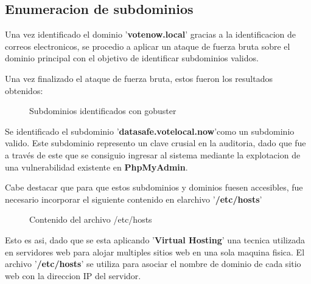 \documentclass[a4paper]{article} %
\begin{document}
  \clearpage
  
  \subsection{Enumeracion de subdominios}
  Una vez identificado el dominio '\textbf{votenow.local}' gracias a la identificacion de correos electronicos, se procedio a aplicar un ataque de fuerza bruta sobre el dominio principal con el objetivo de identificar subdominios validos.

  Una vez finalizado el ataque de fuerza bruta, estos fueron los resultados obtenidos:

  \begin{figure}[h]

    \centering
    \setlength{\fboxrule}{1.8pt}
      \caption{Subdominios identificados con gobuster}
      \label{fig:identifiedSubdomains}
  \end{figure}
    
  \vspace{0.3cm}  
      
  Se identificado el subdominio '\textbf{datasafe.votelocal.now}'como un subdominio valido. Este subdominio represento un clave crusial en la auditoria, dado que fue a través de este que se consiguio ingresar al sistema mediante la explotacion de una vulnerabilidad existente en \textbf{PhpMyAdmin}.

  Cabe destacar que para que estos subdominios y dominios fuesen accesibles, fue necesario incorporar el siguiente contenido en elarchivo '\textbf{/etc/hosts}'

   \begin{figure}[h]

    \centering
    \setlength{\fboxrule}{1.8pt}
      \caption{Contenido del archivo /etc/hosts}
  \end{figure} 
  Esto es asi, dado que se esta aplicando '\textbf{Virtual Hosting}' una tecnica utilizada en servidores web para alojar multiples sitios web en una sola maquina fisica. El archivo '\textbf{/etc/hosts}' se utiliza para asociar el nombre de dominio de cada sitio web con la direccion IP del servidor.
\end{document}
